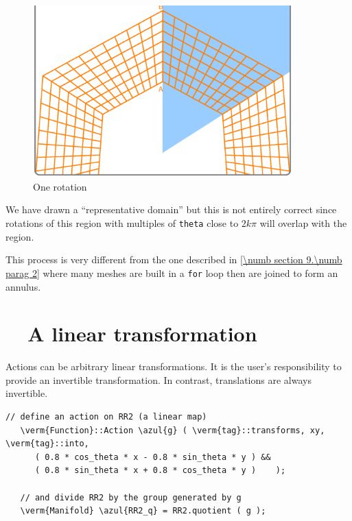 \begin{figure}[ht] \centering
  \includegraphics[width=100mm]{sector-1.eps}
  \caption{One rotation}
  \label{\numb section 7.\numb fig 7}
\end{figure}

We have drawn a ``representative domain'' but this is not entirely correct since
rotations of this region with multiples of {\small\tt theta} close to $ 2k\pi $
will overlap with the region.

This process is very different from the one described in \ref{\numb section 9.\numb parag 2}
where many meshes are built in a {\small\tt for} loop then are joined to form an annulus.


\section{~~A linear transformation}\label{\numb section 7.\numb parag 12}

Actions can be arbitrary linear transformations.
It is the user's responsibility to provide an invertible transformation.
In contrast, translations are always invertible.

\begin{Verbatim}[commandchars=\\\{\},formatcom=\small\tt,frame=single,
   label=parag-\ref{\numb section 7.\numb parag 12}.cpp,rulecolor=\color{coment},
   baselinestretch=0.94,framesep=2mm                                             ]
   // define an action on RR2 (a linear map)
   \verm{Function}::Action \azul{g} ( \verm{tag}::transforms, xy, \verm{tag}::into,
      ( 0.8 * cos_theta * x - 0.8 * sin_theta * y ) &&
      ( 0.8 * sin_theta * x + 0.8 * cos_theta * y )    );

   // and divide RR2 by the group generated by g
   \verm{Manifold} \azul{RR2_q} = RR2.quotient ( g );
\end{Verbatim}

